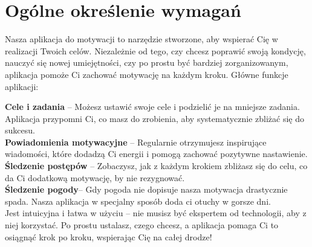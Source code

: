 	\newpage
\section{Ogólne określenie wymagań}		%













\hspace{0.60cm}

Nasza aplikacja do motywacji to narzędzie stworzone, aby wspierać Cię w realizacji Twoich celów. Niezależnie od tego, czy chcesz poprawić swoją kondycję, nauczyć się nowej umiejętności, czy po prostu być bardziej zorganizowanym, aplikacja pomoże Ci zachować motywację na każdym kroku.
Główne funkcje aplikacji:

\textbf{Cele i zadania} – Możesz ustawić swoje cele i podzielić je na mniejsze zadania. Aplikacja przypomni Ci, co masz do zrobienia, aby systematycznie zbliżać się do sukcesu.
\\
\textbf{Powiadomienia motywacyjne} – Regularnie otrzymujesz inspirujące wiadomości, które dodadzą Ci energii i pomogą zachować pozytywne nastawienie.
\\
\textbf{Śledzenie postępów} – Zobaczysz, jak z każdym krokiem zbliżasz się do celu, co da Ci dodatkową motywację, by nie rezygnować.
\\
\textbf{Śledzenie pogody}– Gdy pogoda nie dopisuje nasza motywacja drastycznie spada. Nasza aplikacja w specjalny sposób doda ci otuchy w gorsze dni.
\\
Jest intuicyjna i łatwa w użyciu – nie musisz być ekspertem od technologii, aby z niej korzystać. Po prostu ustalasz, czego chcesz, a aplikacja pomaga Ci to osiągnąć krok po kroku, wspierając Cię na całej drodze!



 
 
 
 
 